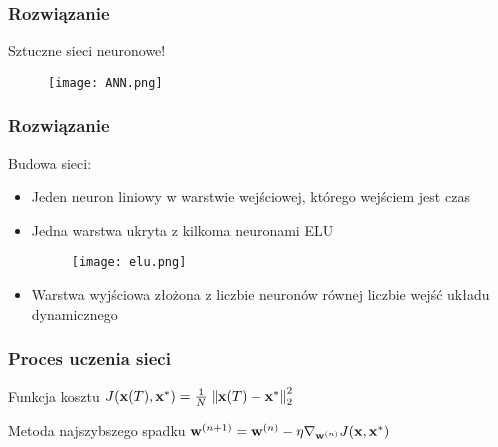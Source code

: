 \documentclass{presentation_fg}
\begin{document}
\begin{frame}
	\frametitle{Rozwiązanie}
	\pause
	{\Huge Sztuczne sieci neuronowe!}
	\pause
	\begin{figure}
		\texttt{[image: ANN.png]}
	\end{figure}
\end{frame}

{
\begin{frame}
	\frametitle{Rozwiązanie}
	Budowa sieci:
	\begin{itemize}
		\item Jeden neuron liniowy w warstwie wejściowej, którego wejściem jest czas
		\pause
		\item Jedna warstwa ukryta z kilkoma neuronami ELU
		\pause
		\begin{figure}
			\texttt{[image: elu.png]}
		\end{figure} 
		\pause
		\item Warstwa wyjściowa złożona z liczbie neuronów równej liczbie wejść układu dynamicznego
	\end{itemize}
\end{frame}
}


\begin{frame}
	\frametitle{Proces uczenia sieci}
	\pause
	\begin{block}{Funkcja kosztu}
		$J({{{{{{{\bf{x}}}}}}}}(T),{{{{{{{{\bf{x}}}}}}}}}^{* })=\frac{1}{N}\parallel \!\!{{{{{{{\bf{x}}}}}}}}(T)-{{{{{{{{\bf{x}}}}}}}}}^{* }{\parallel }_{2}^{2}$
	\end{block}
	\bigskip
	\pause
	\begin{exampleblock}{Metoda najszybszego spadku}
		${{{{{{{{\bf{w}}}}}}}}}^{(n+1)}={{{{{{{{\bf{w}}}}}}}}}^{(n)}-\eta {\nabla }_{{{{{{{{{\bf{w}}}}}}}}}^{(n)}}J({{{{{{{\bf{x}}}}}}}},{{{{{{{{\bf{x}}}}}}}}}^{* })$
	\end{exampleblock}
	
\end{frame}
\end{document}
